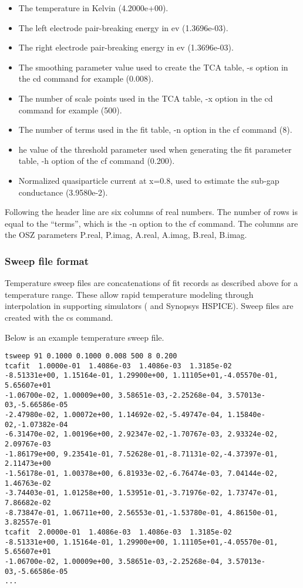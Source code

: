 \begin{itemize}
\item{The temperature in Kelvin (4.2000e+00).}
\item{The left electrode pair-breaking energy in ev (1.3696e-03).}
\item{The right electrode pair-breaking energy in ev (1.3696e-03).}
\item{The smoothing parameter value used to create the TCA table, {\vt
-s} option in the {\vt cd} command for example (0.008).}
\item{The number of scale points used in the TCA table, {\vt -x}
option in the {\vt cd} command for example (500).}
\item{The number of terms used in the fit table, {\vt -n} option in
the {\vt cf} command (8).}
\item{he value of the threshold parameter used when generating the fit
parameter table, {\vt -h} option of the {\vt cf} command (0.200).}
\item{Normalized quasiparticle current at x=0.8, used to estimate the
sub-gap conductance (3.9580e-2).}
\end{itemize}

Following the header line are six columns of real numbers.  The number
of rows is equal to the ``terms'', which is the {\vt -n} option to the
{\vt cf} command.  The columns are the OSZ parameters P.real, P.imag,
A.real, A.imag, B.real, B.imag.

\subsubsection{Sweep file format}

Temperature sweep files are concatenations of fit records as described
above for a temperature range.  These allow rapid temperature modeling
through interpolation in supporting simulators ({\WRspice} and
Synopsys HSPICE).  Sweep files are created with the {\vt cs} command.

Below is an example temperature sweep file.

\begin{verbatim}
tsweep 91 0.1000 0.1000 0.008 500 8 0.200
tcafit  1.0000e-01  1.4086e-03  1.4086e-03  1.3185e-02
-8.51331e+00, 1.15164e-01, 1.29900e+00, 1.11105e+01,-4.05570e-01, 5.65607e+01
-1.06700e-02, 1.00009e+00, 3.58651e-03,-2.25268e-04, 3.57013e-03,-5.66586e-05
-2.47980e-02, 1.00072e+00, 1.14692e-02,-5.49747e-04, 1.15840e-02,-1.07382e-04
-6.31470e-02, 1.00196e+00, 2.92347e-02,-1.70767e-03, 2.93324e-02, 2.09767e-03
-1.86179e+00, 9.23541e-01, 7.52628e-01,-8.71131e-02,-4.37397e-01, 2.11473e+00
-1.56178e-01, 1.00378e+00, 6.81933e-02,-6.76474e-03, 7.04144e-02, 1.46763e-02
-3.74403e-01, 1.01258e+00, 1.53951e-01,-3.71976e-02, 1.73747e-01, 7.86682e-02
-8.73847e-01, 1.06711e+00, 2.56553e-01,-1.53780e-01, 4.86150e-01, 3.82557e-01
tcafit  2.0000e-01  1.4086e-03  1.4086e-03  1.3185e-02
-8.51331e+00, 1.15164e-01, 1.29900e+00, 1.11105e+01,-4.05570e-01, 5.65607e+01
-1.06700e-02, 1.00009e+00, 3.58651e-03,-2.25268e-04, 3.57013e-03,-5.66586e-05
...
\end{verbatim}

